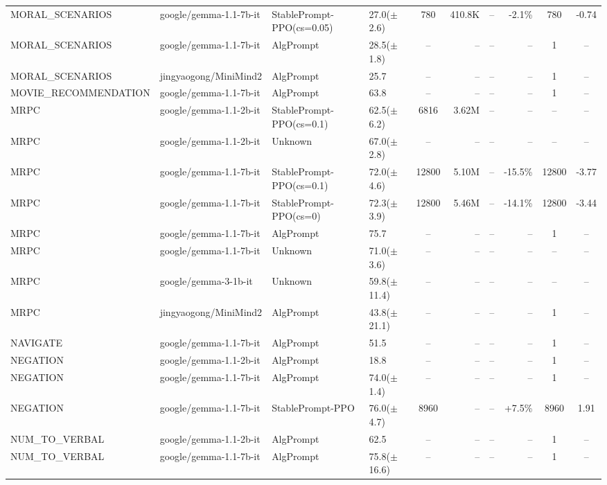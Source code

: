 {\begin{longtable}{@{}p{5.5cm}p{4.5cm}p{2.5cm}lcrrrcc@{}}
MORAL\_SCENARIOS & google/gemma-1.1-7b-it & StablePrompt-PPO(cs=0.05) & 27.0($\pm$2.6) & 780 & 410.8K & -- & -2.1\% & 780 & -0.74 \\
MORAL\_SCENARIOS & google/gemma-1.1-7b-it & AlgPrompt & 28.5($\pm$1.8) & -- & -- & -- & -- & 1 & -- \\
\midrule
MORAL\_SCENARIOS & jingyaogong/MiniMind2 & AlgPrompt & 25.7 & -- & -- & -- & -- & 1 & -- \\
\midrule
MOVIE\_RECOMMENDATION & google/gemma-1.1-7b-it & AlgPrompt & 63.8 & -- & -- & -- & -- & 1 & -- \\
\midrule
MRPC & google/gemma-1.1-2b-it & StablePrompt-PPO(cs=0.1) & 62.5($\pm$6.2) & 6816 & 3.62M & -- & -- & -- & -- \\
MRPC & google/gemma-1.1-2b-it & Unknown & 67.0($\pm$2.8) & -- & -- & -- & -- & -- & -- \\
\midrule
MRPC & google/gemma-1.1-7b-it & StablePrompt-PPO(cs=0.1) & 72.0($\pm$4.6) & 12800 & 5.10M & -- & -15.5\% & 12800 & -3.77 \\
MRPC & google/gemma-1.1-7b-it & StablePrompt-PPO(cs=0) & 72.3($\pm$3.9) & 12800 & 5.46M & -- & -14.1\% & 12800 & -3.44 \\
MRPC & google/gemma-1.1-7b-it & AlgPrompt & 75.7 & -- & -- & -- & -- & 1 & -- \\
MRPC & google/gemma-1.1-7b-it & Unknown & 71.0($\pm$3.6) & -- & -- & -- & -- & -- & -- \\
\midrule
MRPC & google/gemma-3-1b-it & Unknown & 59.8($\pm$11.4) & -- & -- & -- & -- & -- & -- \\
\midrule
MRPC & jingyaogong/MiniMind2 & AlgPrompt & 43.8($\pm$21.1) & -- & -- & -- & -- & 1 & -- \\
\midrule
NAVIGATE & google/gemma-1.1-7b-it & AlgPrompt & 51.5 & -- & -- & -- & -- & 1 & -- \\
\midrule
NEGATION & google/gemma-1.1-2b-it & AlgPrompt & 18.8 & -- & -- & -- & -- & 1 & -- \\
\midrule
NEGATION & google/gemma-1.1-7b-it & AlgPrompt & 74.0($\pm$1.4) & -- & -- & -- & -- & 1 & -- \\
NEGATION & google/gemma-1.1-7b-it & StablePrompt-PPO & 76.0($\pm$4.7) & 8960 & -- & -- & +7.5\% & 8960 & 1.91 \\
\midrule
NUM\_TO\_VERBAL & google/gemma-1.1-2b-it & AlgPrompt & 62.5 & -- & -- & -- & -- & 1 & -- \\
\midrule
NUM\_TO\_VERBAL & google/gemma-1.1-7b-it & AlgPrompt & 75.8($\pm$16.6) & -- & -- & -- & -- & 1 & -- \\

\end{longtable}}

